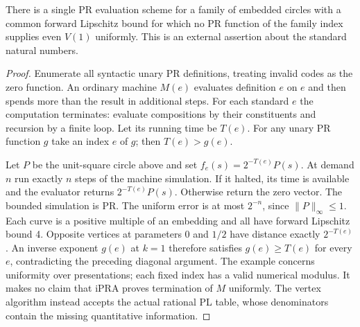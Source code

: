 \begin{proposition}\label{prop:delayedcurves}
There is a single PR evaluation scheme for a family of embedded circles with a common forward Lipschitz bound for which no PR function of the family index supplies even $V(1)$ uniformly. This is an external assertion about the standard natural numbers.
\end{proposition}
\begin{proof}
Enumerate all syntactic unary PR definitions, treating invalid codes as the zero function. An ordinary machine $M(e)$ evaluates definition $e$ on $e$ and then spends more than the result in additional steps. For each standard $e$ the computation terminates: evaluate compositions by their constituents and recursion by a finite loop. Let its running time be $T(e)$. For any unary PR function $g$ take an index $e$ of $g$; then $T(e)>g(e)$.

Let $P$ be the unit-square circle above and set $f_e(s)=2^{-T(e)}P(s)$. At demand $n$ run exactly $n$ steps of the machine simulation. If it halted, its time is available and the evaluator returns $2^{-T(e)}P(s)$. Otherwise return the zero vector. The bounded simulation is PR. The uniform error is at most $2^{-n}$, since $\|P\|_\infty\le1$. Each curve is a positive multiple of an embedding and all have forward Lipschitz bound 4. Opposite vertices at parameters $0$ and $1/2$ have distance exactly $2^{-T(e)}$. An inverse exponent $g(e)$ at $k=1$ therefore satisfies $g(e)\ge T(e)$ for every $e$, contradicting the preceding diagonal argument. The example concerns uniformity over presentations; each fixed index has a valid numerical modulus. It makes no claim that iPRA proves termination of $M$ uniformly. The vertex algorithm instead accepts the actual rational PL table, whose denominators contain the missing quantitative information.
\end{proof}

